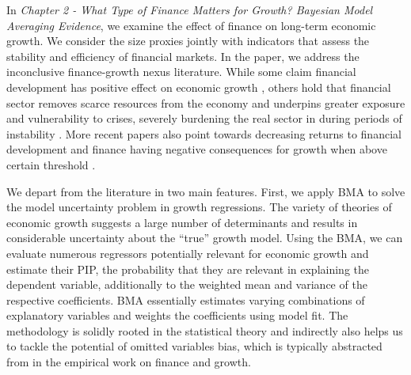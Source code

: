 \begin{refsection}
In \emph{Chapter 2 - What Type of Finance Matters for Growth? Bayesian Model Averaging Evidence}, we examine the effect of finance on long-term economic growth. We consider the size proxies jointly with indicators that assess the stability and efficiency of financial markets. In the paper, we address the inconclusive finance-growth nexus literature. While some claim financial development has positive effect on economic growth \parencite{AtjeJovanovich1993,KingLevine1993a,RajanZingales1998}, others hold that financial sector removes scarce resources from the economy \parencite{bolton2016cream,Tobin1984,axelson2015wall} and underpins greater exposure and vulnerability to crises, severely burdening the real sector in during periods of instability \parencite{Minsky1991,Stiglitz2000}. More recent papers also point towards decreasing returns to financial development and finance having negative consequences for growth when above certain threshold \parencite{Arcandetal2012,LawSingh2014,RousseauWachtel2011}. 

We depart from the literature in two main features. First, we apply \ac{BMA} to solve the model uncertainty problem in growth regressions. The variety of theories of economic growth suggests a large number of determinants and results in considerable uncertainty about the ``true'' growth model. Using the \ac{BMA}, we can evaluate numerous regressors potentially relevant for economic growth and estimate their \ac{PIP}, the probability that they are relevant in explaining the dependent variable, additionally to the weighted mean and variance of the respective coefficients. \ac{BMA} essentially estimates varying combinations of explanatory variables and weights the coefficients using model fit. The methodology is solidly rooted in the statistical theory \parencite{Rafteryetal1997,Koopetal2007} and indirectly also helps us to tackle the potential of omitted variables bias, which is typically abstracted from in the empirical work on finance and growth.


\end{refsection}

